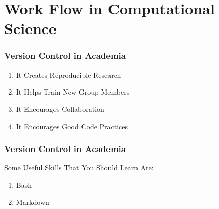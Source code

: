 
\section[Work Flow]{Work Flow in Computational Science}

\begin{frame}
\frametitle{\large{Version Control in Academia}}
\begin{enumerate}
\item It Creates Reproducible Research
\item It Helps Train New Group Members
\item It Encourages Collaboration
\item It Encourages Good Code Practices
\end{enumerate}
\end{frame}
\note{}

\begin{frame}
\frametitle{\large{Version Control in Academia}}
Some Useful Skills That You Should Learn Are:
\begin{enumerate}
\item Bash
\item Markdown
\end{enumerate}
\end{frame}
\note{}
